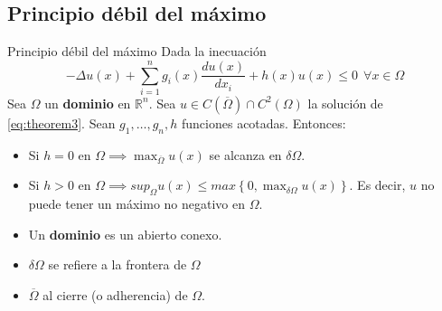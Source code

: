 \subsection{Principio débil del máximo}
\begin{mathresult}{Principio débil del máximo}
Dada la inecuación
\begin{equation}\label{eq:theorem3}
-\Delta u(x) + \sum_{i=1}^n g_i(x)\frac{du(x)}{dx_i}+h(x)u(x) \le 0 \ \ \forall x\in\Omega
\end{equation}
Sea $\Omega$ un \textbf{dominio} en $\mathbb{R}^n$.
Sea $u\in C(\overline{\Omega})\cap C^2(\Omega)$ la solución de \eqref{eq:theorem3}.
Sean $g_1,\hdots, g_n,h$ funciones acotadas.
Entonces:
\begin{itemize}
\item Si $h=0$ en $\Omega \implies \max_{\overline{\Omega}} u(x)$ se alcanza en $\delta\Omega$. 
\item Si $h>0$ en $\Omega \implies sup_{\Omega} u(x) \le max\left\{0, \max_{\delta\Omega} u(x)\right\}$. Es decir, $u$ no puede tener un máximo no negativo en $\Omega$.
\end{itemize}
\end{mathresult}
\newpage
\see
\begin{itemize}
\item Un \textbf{dominio} es un abierto conexo.
\item $\delta\Omega$ se refiere a la frontera de $\Omega$ 
\item $\overline{\Omega}$ al cierre (o adherencia) de $\Omega$.
\end{itemize}

